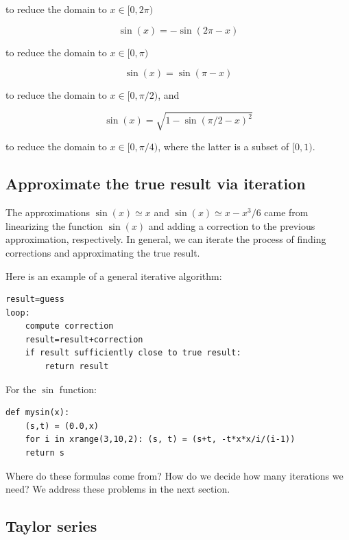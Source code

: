\documentclass[justified,sixbynine]{tufte-book}
\theoremstyle{plain}%
\theoremstyle{definition}
\theoremstyle{remark}
\begin{document}
\begin{fullwidth}
to reduce the domain to $x \in [0,2\pi)$

\begin{equation}
\sin(x) = -\sin(2\pi - x)
\end{equation}

to reduce the domain to $x \in [0,\pi)$

\begin{equation}
\sin(x) = \sin(\pi - x)
\end{equation}

to reduce the domain to $x \in [0,\pi/2)$, and

\begin{equation}
\sin(x) = \sqrt{1 - \sin(\pi/2 - x)^2}
\end{equation}

to reduce the domain to $x \in [0,\pi/4)$, where the latter is a subset of $[0,1)$.

\goodbreak\subsection{Approximate the true result via iteration}


The approximations $\sin(x) \simeq x$ and $\sin(x) \simeq x - x^3/6$ came from linearizing the function $\sin(x)$ and adding a correction to the previous approximation, respectively. In general, we can iterate the process of finding corrections and approximating the true result.

Here is an example of a general iterative algorithm:
\begin{lstlisting}
result=guess
loop:
    compute correction
    result=result+correction
    if result sufficiently close to true result:
        return result
\end{lstlisting}

For the $\sin$ function:

\begin{lstlisting}
def mysin(x):
    (s,t) = (0.0,x)
    for i in xrange(3,10,2): (s, t) = (s+t, -t*x*x/i/(i-1))
    return s
\end{lstlisting}

Where do these formulas come from? How do we decide how many iterations we need? We address these problems in the next section.


\goodbreak\subsection{Taylor series}


\end{fullwidth}
\end{document}
